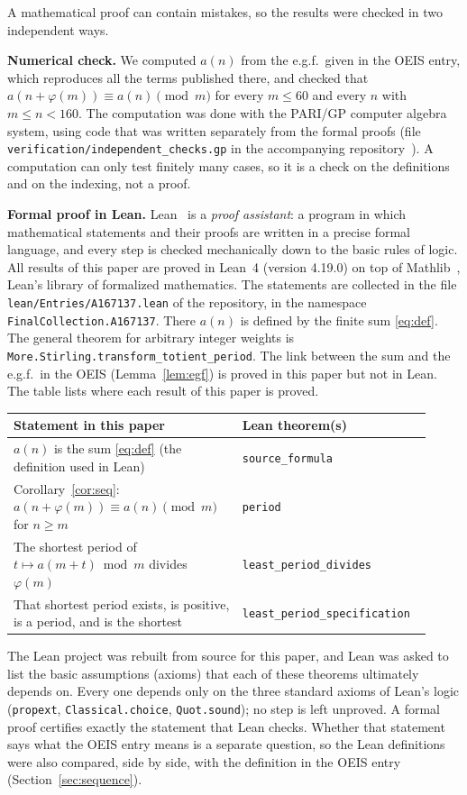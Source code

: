 \documentclass[11pt,a4paper]{article}
\theoremstyle{definition}
\theoremstyle{remark}
\newcommand{\para}[1]{\par\medskip\noindent\textbf{#1}\enspace}
\begin{document}
A mathematical proof can contain mistakes, so the results were checked in two independent ways.

\para{Numerical check.}
We computed $a(n)$ from the e.g.f.\ given in the OEIS entry, which reproduces all the terms published there, and
checked that $a(n+\varphi(m))\equiv a(n)\pmod m$ for every $m\le60$ and every $n$ with $m\le n<160$.
The computation was done with the PARI/GP computer algebra system, using code that was written separately from the
formal proofs (file \texttt{verification/independent\_checks.gp} in the accompanying repository~\cite{repo}).
A computation can only test finitely many cases, so it is a check on the definitions and on the indexing, not a proof.

\para{Formal proof in Lean.}
Lean~\cite{lean} is a \emph{proof assistant}: a program in which mathematical statements and their proofs are written
in a precise formal language, and every step is checked mechanically down to the basic rules of logic. All results of
this paper are proved in Lean~4 (version 4.19.0) on top of Mathlib~\cite{mathlib}, Lean's library of formalized
mathematics. The statements are collected in the file \texttt{lean/Entries/A167137.lean} of the repository,
in the namespace \texttt{FinalCollection.A167137}. There $a(n)$ is defined by the finite sum \eqref{eq:def}. The general theorem for arbitrary integer weights is \texttt{More.Stirling.transform\_totient\_period}. The link between the sum and the e.g.f.\ in the OEIS (Lemma~\ref{lem:egf}) is proved in this paper but not in Lean.
The table lists where each result of this paper is proved.
\begin{center}\small\renewcommand{\arraystretch}{1.25}
\begin{tabular}{>{\raggedright\arraybackslash}p{0.52\linewidth}>{\raggedright\arraybackslash}p{0.4\linewidth}}
\toprule
Statement in this paper & Lean theorem(s)\\
\midrule
$a(n)$ is the sum \eqref{eq:def} (the definition used in Lean) & \texttt{source\_\allowbreak{}formula} \\
Corollary~\ref{cor:seq}: $a(n+\varphi(m))\equiv a(n)\pmod m$ for $n\ge m$ & \texttt{period} \\
The shortest period of $t\mapsto a(m+t)\bmod m$ divides $\varphi(m)$ & \texttt{least\_\allowbreak{}period\_\allowbreak{}divides} \\
That shortest period exists, is positive, is a period, and is the shortest & \texttt{least\_\allowbreak{}period\_\allowbreak{}specification} \\
\bottomrule
\end{tabular}
\end{center}
The Lean project was rebuilt from source for this paper, and Lean was asked to list the basic assumptions (axioms)
that each of these theorems ultimately depends on. Every one depends only on the three standard axioms of Lean's logic
(\texttt{propext}, \texttt{Classical.choice}, \texttt{Quot.sound}); no step is left unproved. A formal proof certifies
exactly the statement that Lean checks. Whether that statement says what the OEIS entry means is a separate question,
so the Lean definitions were also compared, side by side, with the definition in the OEIS entry
(Section~\ref{sec:sequence}).
\end{document}
